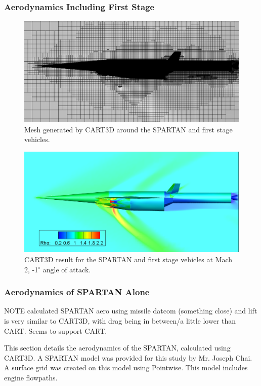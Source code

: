   \subsubsection{Aerodynamics Including First Stage}
		
		\begin{figure}
\centering
\includegraphics[width=0.7\linewidth]{figures/3_vehicle_design/CARTmesh}
\caption{ Mesh generated by CART3D around the SPARTAN and first stage vehicles.}
\label{fig:CARTmesh}
\end{figure}
\begin{figure}
\centering
\includegraphics[width=0.7\linewidth]{figures/3_vehicle_design/CARTcontour}
\caption{CART3D result for the SPARTAN and first stage vehicles at Mach 2, -1$^\circ$ angle of attack.}
\label{fig:CARTcontour}
\end{figure}




  \subsubsection{Aerodynamics of SPARTAN Alone}
  
  NOTE calculated SPARTAN aero using missile datcom (something close) and lift is very similar to CART3D, with drag being in between/a little lower than CART. Seems to support CART. 
  
  
This section details the aerodynamics of the SPARTAN, calculated using CART3D. A SPARTAN model was provided for this study by Mr. Joseph Chai. A surface grid was created on this model using Pointwise\cite{Pointwise}. This model includes engine flowpaths. 

